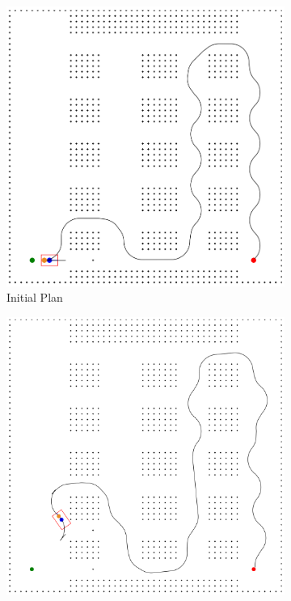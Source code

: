 \documentclass{article}
\begin{document}
\newpage

\begin{figure}[ht]
    \centering
    \begin{subfigure}[b]{0.3\textwidth}
        \includegraphics[width = \textwidth]{map6plan2.png}
        \caption{Initial Plan}
        \label{fig:map61}
    \end{subfigure}
    \begin{subfigure}[b]{0.3\textwidth}
        \includegraphics[width = \textwidth]{map6plan3.png}

\end{subfigure}
\end{figure}
\end{document}
